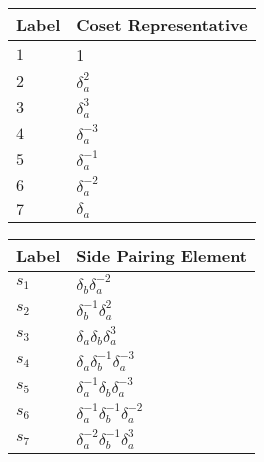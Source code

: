 \documentclass{article}
\begin{document}
\begin{center}
\begin{tabular}{ll}
\toprule
Label & Coset Representative\\
\midrule
$1$ & 1 \\
$2$ & $\delta_a^{2}$ \\
$3$ & $\delta_a^{3}$ \\
$4$ & $\delta_a^{-3}$ \\
$5$ & $\delta_a^{-1}$ \\
$6$ & $\delta_a^{-2}$ \\
$7$ & $\delta_a^{}$ \\
\bottomrule
\end{tabular}
\hfill
\begin{tabular}{ll}
\toprule
Label & Side Pairing Element\\
\midrule
$s_{1}$ & $\delta_b^{}\delta_a^{-2}$ \\
$s_{2}$ & $\delta_b^{-1}\delta_a^{2}$ \\
$s_{3}$ & $\delta_a^{}\delta_b^{}\delta_a^{3}$ \\
$s_{4}$ & $\delta_a^{}\delta_b^{-1}\delta_a^{-3}$ \\
$s_{5}$ & $\delta_a^{-1}\delta_b^{}\delta_a^{-3}$ \\
$s_{6}$ & $\delta_a^{-1}\delta_b^{-1}\delta_a^{-2}$ \\
$s_{7}$ & $\delta_a^{-2}\delta_b^{-1}\delta_a^{3}$ \\
\bottomrule
\end{tabular}
\end{center}

\thispagestyle{empty}
\end{document}
